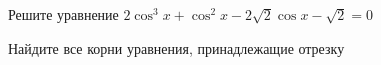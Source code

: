 \begin{ex}
	\begin{condition}
		\begin{enumcols}[label=\asbuk*)]
			\item Решите уравнение \( 2\cos^3 x +\cos^2 x -2\sqrt{2}\cos x - \sqrt{2} = 0 \)
			\item Найдите все корни уравнения, принадлежащие отрезку \(  \)
		\end{enumcols}
	\end{condition}
	\answer{}
\end{ex}